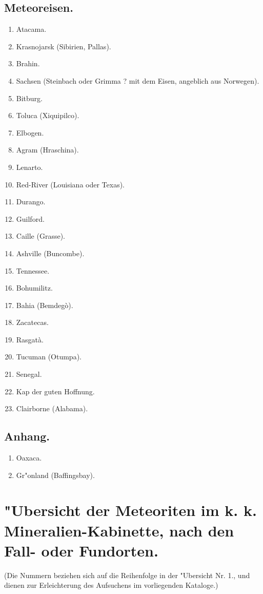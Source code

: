 \documentclass[a4paper, 11pt, oneside, polutonikogreek, german]{article}
\begin{document}
\subsection{Meteoreisen.}
\begin{enumerate}
    \small
    \item Atacama.
    \item Krasnojarsk (Sibirien, Pallas).
    \item Brahin.
    \item Sachsen (Steinbach oder Grimma ? mit dem Eisen, angeblich aus Norwegen).
    \item Bitburg.
    \item Toluca (Xiquipilco).
    \item Elbogen.
    \item Agram (Hraschina).
    \item Lenarto.
    \item Red-River (Louisiana oder Texas).
    \item Durango.
    \item Guilford.
    \item Caille (Grasse).
    \item Ashville (Buncombe).
    \item Tennessee.
    \item Bohumilitz.
    \item Bahia (Bemdegò).
    \item Zacatecas.
    \item Rasgatà.
    \item Tucuman (Otumpa).
    \item Senegal.
    \item Kap der guten Hoffnung.
    \item Clairborne (Alabama).
\end{enumerate}
\subsection{Anhang.}
\begin{enumerate}
    \small
    \item Oaxaca.
    \item Gr"onland (Baffingsbay).
\end{enumerate}
\clearpage
\section{"Ubersicht der Meteoriten im k. k. Mineralien-Kabinette, nach den Fall- oder Fundorten.}
\begin{center}
\small
(Die Nummern beziehen sich auf die Reihenfolge in der "Ubersicht Nr. 1., und dienen zur Erleichterung des Aufsuchens im vorliegenden Kataloge.)
\end{center}
\end{document}
